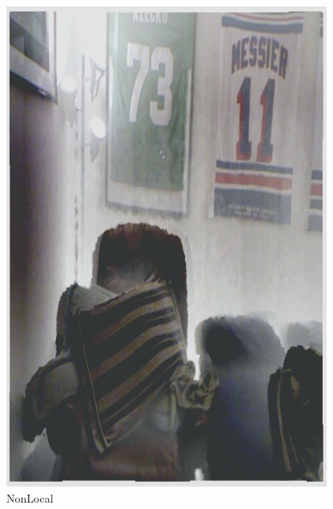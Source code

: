 \documentclass[12pt]{article}
\begin{document}
\begin{figure}[!h]
\begin{minipage}[t]{0.24\linewidth}
        \includegraphics[width=0.9\linewidth]{sample_pictures/after_DHAZY_NonLocal.jpg}
        \caption*{NonLocal}
    \end{minipage}
 \end{figure}\par
\end{document}
